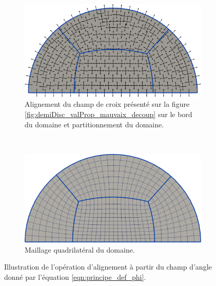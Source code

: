\begin{figure}[!h]
\centering
\begin{subfigure}{0.65\textwidth}
    \includegraphics[width=\textwidth]{images/demi_disc_second_phi_first.pdf}
    \caption{Alignement du champ de croix présenté sur la figure \ref{fig:demiDisc_valProp_mauvaix_decoup} sur le bord du domaine et partitionnement du domaine.}
    \label{fig:demi_disc_second_cond_phi_first}
\end{subfigure}
\\[0.3ex]
\begin{subfigure}{0.65\textwidth}
    \includegraphics[width=\textwidth]{images/demi_disc_second_phi_second.pdf}
    \caption{Maillage quadrilatéral du domaine.}
    \label{fig:demi_disc_second_cond_phi_second}
\end{subfigure}
\caption{Illustration de l'opération d'alignement à partir du champ d'angle donné par l'équation \eqref{eqn:principe_def_phi}.}
\label{fig:demi_disc_second_cond_phi}
\end{figure}

